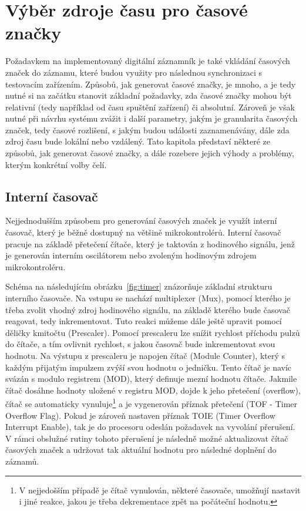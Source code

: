 \section{Výběr zdroje času pro časové značky}
\label{zdroje_casu}
Požadavkem na implementovaný digitální záznamník je také vkládání časových značek do záznamu, které budou využity pro následnou synchronizaci s testovacím zařízením. Způsobů, jak generovat časové značky, je mnoho, a je tedy nutné si na začátku stanovit základní požadavky, zda časové značky mohou být relativní (tedy například od času spuštění zařízení) či absolutní. Zároveň je však nutné při návrhu systému zvážit i další parametry, jakým je granularita časových značek, tedy časové rozlišení, s jakým budou události zaznamenávány, dále zda zdroj času bude lokální nebo vzdálený. Tato kapitola představí některé ze způsobů, jak generovat časové značky, a dále rozebere jejich výhody a problémy, kterým konkrétní volby čelí. 

\subsection{Interní časovač}
Nejjednodušším způsobem pro generování časových značek je využít interní časovač, který je běžně dostupný na většině mikrokontrolérů. Interní časovač pracuje na základě přetečení čítače, který je taktován z hodinového signálu, jenž je generován interním oscilátorem nebo zvoleným hodinovým zdrojem mikrokontroléru. 

Schéma na následujícím obrázku~\ref{fig:timer} znázorňuje základní strukturu interního časovače. Na vstupu se nachází multiplexer (Mux), pomocí kterého je třeba zvolit vhodný zdroj hodinového signálu, na základě kterého bude časovač reagovat, tedy inkrementovat. Tuto reakci můžeme dále ještě upravit pomocí děličky kmitočtu (Prescaler). Pomocí prescaleru lze snížit rychlost příchodu pulzů do čítače, a tím ovlivnit rychlost, s jakou časovač bude inkrementovat svou hodnotu. Na výstupu z prescaleru je napojen čítač (Module Counter), který s každým přijatým impulzem zvýší svou hodnotu o jedničku. Tento čítač je navíc svázán s modulo registrem (MOD), který definuje mezní hodnotu čítače. Jakmile čítač dosáhne hodnoty uložené v registru MOD, dojde k jeho přetečení (overflow), čítač se automaticky vynuluje\footnote{V nejjedošším případě je čítač vynulován, některé časovače, umožňují nastavit i jiné reakce, jakou je třeba dekrementace zpět na počáteční hodnotu.} a je vygenerován příznak přetečení (TOF - Timer Overflow Flag). Pokud je zároveň nastaven příznak TOIE (Timer Overflow Interrupt Enable), tak je do procesoru odeslán požadavek na vyvolání přerušení. V rámci obslužné rutiny tohoto přerušení je následně možné aktualizovat čítač časových značek a udržovat tak aktuální hodnotu pro následné doplnění do záznamů. 

